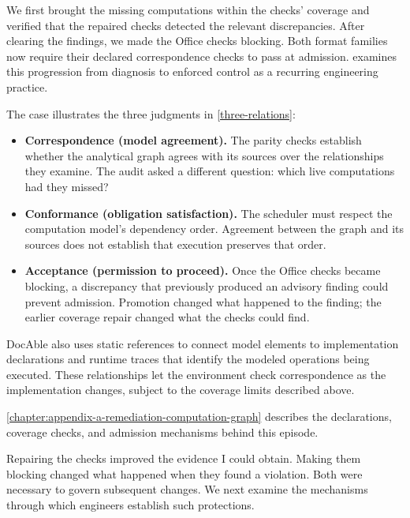 We first brought the missing computations within the checks' coverage and verified that the repaired checks detected the relevant discrepancies. After clearing the findings, we made the Office checks blocking. Both format families now require their declared correspondence checks to pass at admission.  examines this progression from diagnosis to enforced control as a recurring engineering practice.

The case illustrates the three judgments in \autoref{three-relations}:
\begin{itemize}
\item \textbf{Correspondence (model agreement).} The parity checks establish whether the analytical graph agrees with its sources over the relationships they examine. The audit asked a different question: which live computations had they missed?
\item \textbf{Conformance (obligation satisfaction).} The scheduler must respect the computation model's dependency order. Agreement between the graph and its sources does not establish that execution preserves that order.
\item \textbf{Acceptance (permission to proceed).} Once the Office checks became blocking, a discrepancy that previously produced an advisory finding could prevent admission. Promotion changed what happened to the finding; the earlier coverage repair changed what the checks could find.
\end{itemize}

DocAble also uses static references to connect model elements to implementation declarations and runtime traces that identify the modeled operations being executed. These relationships let the environment check correspondence as the implementation changes, subject to the coverage limits described above.


\autoref{chapter:appendix-a-remediation-computation-graph} describes the declarations, coverage checks, and admission mechanisms behind this episode.

Repairing the checks improved the evidence I could obtain. Making them blocking changed what happened when they found a violation. Both were necessary to govern subsequent changes. We next examine the mechanisms through which engineers establish such protections.
